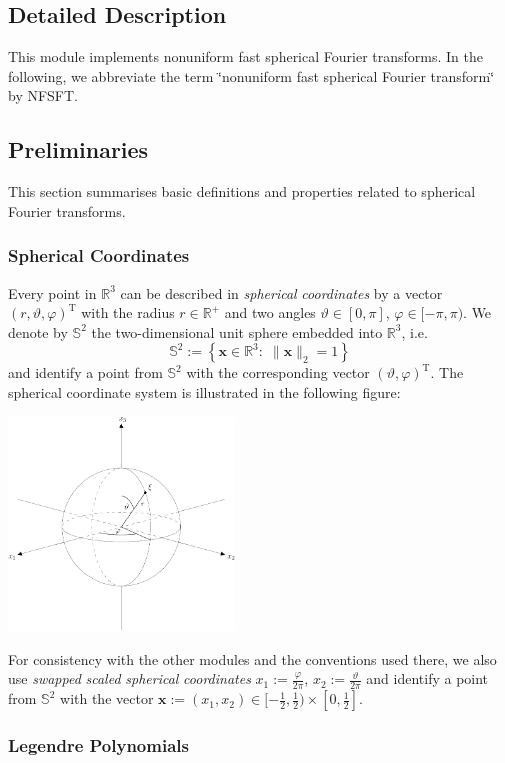 \subsection{Detailed Description}
This module implements nonuniform fast spherical Fourier transforms. In the following, we abbreviate the term \char`\"{}nonuniform fast spherical Fourier transform\char`\"{} by NFSFT.\hypertarget{group__nfsft_Preliminaries}{}\subsection{Preliminaries}\label{group__nfsft_Preliminaries}
This section summarises basic definitions and properties related to spherical Fourier transforms.\hypertarget{group__nfsft_sc}{}\subsubsection{Spherical Coordinates}\label{group__nfsft_sc}
Every point in $\mathbb{R}^3$ can be described in {\em spherical\/} {\em coordinates\/} by a vector $(r,\vartheta,\varphi)^{\mathrm{T}}$ with the radius $r \in \mathbb{R}^{+}$ and two angles $\vartheta \in [0,\pi]$, $\varphi \in [-\pi,\pi)$. We denote by $\mathbb{S}^2$ the two-dimensional unit sphere embedded into $\mathbb{R}^3$, i.e. \[ \mathbb{S}^2 := \left\{\mathbf{x} \in \mathbb{R}^{3}:\; \|\mathbf{x}\|_2=1\right\} \] and identify a point from $\mathbb{S}^2$ with the corresponding vector $(\vartheta,\varphi)^{\mathrm{T}}$. The spherical coordinate system is illustrated in the following figure:  \begin{ImageNoCaption}\mbox{\includegraphics[width=0.45\textwidth]{sphere}}
\end{ImageNoCaption}
 For consistency with the other modules and the conventions used there, we also use {\em swapped\/} {\em scaled\/} {\em spherical\/} {\em coordinates\/} $x_1 := \frac{\varphi}{2\pi}$, $x_2 := \frac{\vartheta}{2\pi}$ and identify a point from $\mathbb{S}^2$ with the vector $\mathbf{x} := \left(x_1,x_2\right) \in [-\frac{1}{2}, \frac{1}{2}) \times [0,\frac{1}{2}]$.\hypertarget{group__nfsft_lp}{}\subsubsection{Legendre Polynomials}\label{group__nfsft_lp}
